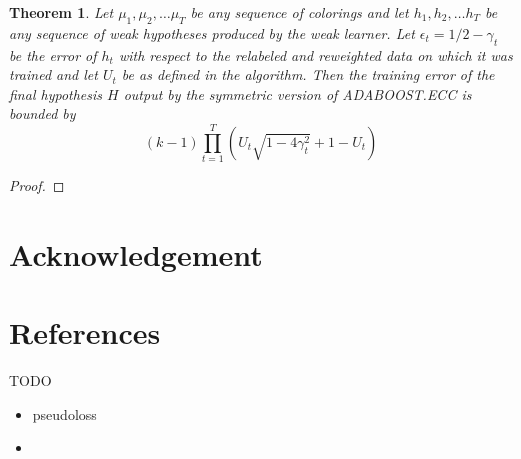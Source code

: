 \documentclass[11pt]{article}
\newtheorem{theorem}{Theorem}
\begin{document}
\begin{theorem}
Let $\mu_1, \mu_2, \ldots \mu_T$ be any sequence of colorings and let $h_1, h_2, \ldots h_T$ be any sequence of weak hypotheses produced by the weak learner. Let $\epsilon_t = 1/2 - \gamma_t$ be the error of $h_t$ with respect to the relabeled and reweighted data on which it was trained and let $U_t$ be as defined in the algorithm. Then the training error of the final hypothesis $H$ output by the symmetric version of ADABOOST.ECC is bounded by 
$$(k-1)\prod_{t=1}^T \left(U_t \sqrt{1-4\gamma_t^2} + 1-U_t\right)$$
\end{theorem}
\begin{proof}

\end{proof}
\section{Acknowledgement}
\section{References}
TODO
\begin{itemize}
\item pseudoloss
\item 
\end{itemize}
\end{document}
